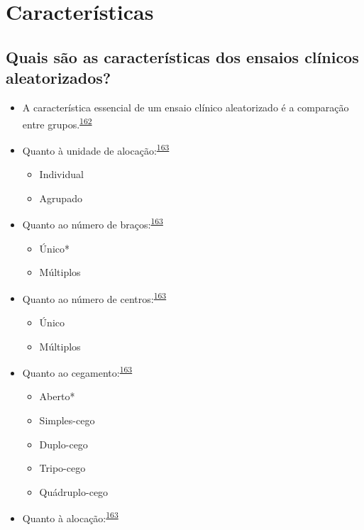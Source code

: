 \documentclass[
  a4paper,
]{book}
\begin{document}
\hypertarget{caracteristicas}{%
\section{Características}\label{caracteristicas}}

\hypertarget{quais-suxe3o-as-caracteruxedsticas-dos-ensaios-cluxednicos-aleatorizados}{%
\subsection{Quais são as características dos ensaios clínicos aleatorizados?}\label{quais-suxe3o-as-caracteruxedsticas-dos-ensaios-cluxednicos-aleatorizados}}

\begin{itemize}
\item
  A característica essencial de um ensaio clínico aleatorizado é a comparação entre grupos.\textsuperscript{\protect\hyperlink{ref-bland2011}{162}}
\item
  Quanto à unidade de alocação:\textsuperscript{\protect\hyperlink{ref-Bruce2022}{163}}

  \begin{itemize}
  \item
    Individual
  \item
    Agrupado
  \end{itemize}
\item
  Quanto ao número de braços:\textsuperscript{\protect\hyperlink{ref-Bruce2022}{163}}

  \begin{itemize}
  \item
    Único*
  \item
    Múltiplos
  \end{itemize}
\item
  Quanto ao número de centros:\textsuperscript{\protect\hyperlink{ref-Bruce2022}{163}}

  \begin{itemize}
  \item
    Único
  \item
    Múltiplos
  \end{itemize}
\item
  Quanto ao cegamento:\textsuperscript{\protect\hyperlink{ref-Bruce2022}{163}}

  \begin{itemize}
  \item
    Aberto*
  \item
    Simples-cego
  \item
    Duplo-cego
  \item
    Tripo-cego
  \item
    Quádruplo-cego
  \end{itemize}
\item
  Quanto à alocação:\textsuperscript{\protect\hyperlink{ref-Bruce2022}{163}}


\end{itemize}
\end{document}
